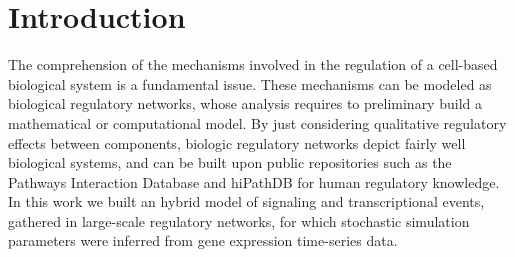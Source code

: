
\section{Introduction}






The comprehension of the mechanisms involved in the regulation of a cell-based biological system is a fundamental 
issue. These mechanisms can be modeled as biological regulatory networks, whose analysis requires to preliminary build a 
mathematical or computational model. 
By just considering qualitative regulatory effects between components, biologic regulatory networks
depict fairly well biological systems, and can be built upon public repositories such as the Pathways 
Interaction Database \cite{schaefer2009pid} and  
hiPathDB \cite{yu2012hipathdb} for human regulatory knowledge.
In this work we built an hybrid model of signaling and transcriptional events, gathered in large-scale regulatory networks, 
for which stochastic simulation parameters were inferred from 
gene expression time-series data.  


